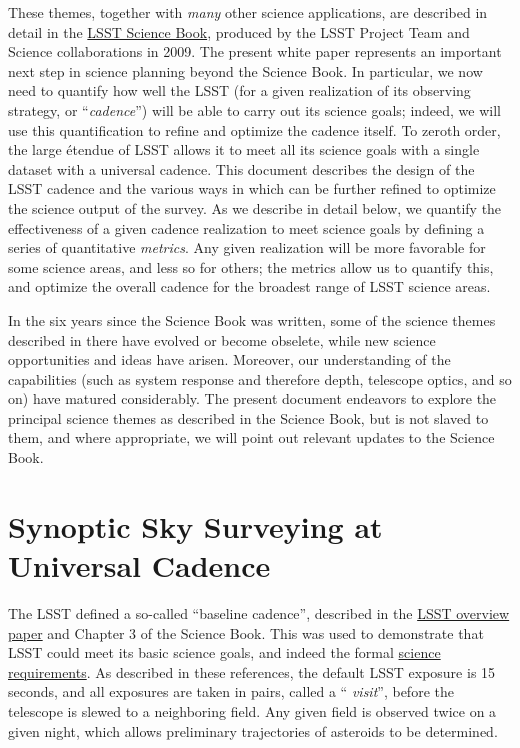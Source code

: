 These themes, together with {\em many} other science applications, are
described in detail in the
\href{http://lsst.org/scientists/scibook}{LSST Science Book}, produced
by the LSST Project Team and Science collaborations in 2009.  The
present white paper represents an important next step in science
planning beyond the Science Book.  In particular, we now need to
quantify how well the LSST (for a given realization of its observing
strategy, or ``{\em cadence}'') will be able to carry out its science
goals; indeed, we will use this quantification to refine and optimize
the cadence itself.  To zeroth order, the large \'etendue of LSST
allows it to meet all its science goals with a single dataset with a
universal cadence.  This document describes the design of the LSST
cadence and the various ways in which can be further refined to
optimize the science output of the survey.  As we describe in detail
below, we quantify the effectiveness of a given cadence realization to
meet science goals by defining a series of quantitative {\em metrics}.
Any given realization will be more favorable for some science areas,
and less so for others; the metrics allow us to quantify this, and
optimize the overall cadence for the broadest range of LSST science
areas.

In the six years since the Science Book was written, some of the
science themes described in there have evolved or become obselete,
while new science opportunities and ideas have arisen.  Moreover, our
understanding of the capabilities (such as system response and
therefore depth, telescope optics, and so on) have matured
considerably.  The present document endeavors to explore the principal
science themes as described in the Science Book, but is not slaved to
them, and where appropriate, we will point out relevant updates to the
Science Book.




\section{Synoptic Sky Surveying at Universal Cadence}
\def\secname{intro:baseline}\label{sec:\secname}

  The LSST defined a so-called ``baseline cadence'', described in the
  \href{http://adsabs.harvard.edu/abs/2008arXiv0805.2366I}{LSST
    overview paper} and Chapter 3 of the Science Book.  This was used
  to demonstrate that LSST could meet its basic science goals, and
  indeed the formal
  \href{https://www.lsstcorp.org/docushare/dsweb/Get/LPM-17}{science
    requirements}.    As 
  described in these references, the default LSST exposure is 15
  seconds, and all exposures are taken in pairs, called a ``{\em
    visit}'', before the telescope is slewed to a neighboring field.
   Any given field is observed twice on a given night, which allows
   preliminary trajectories of asteroids to be determined.  

